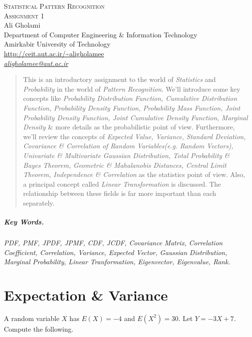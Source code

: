 \documentclass[12pt]{article}
\numberwithin{equation}{section}
\numberwithin{table}{section}
\numberwithin{figure}{section}
\begin{document}

\begin{center}
\textsc{\Large Statistical Pattern Recognition} \\[2pt]
	\textsc{\large Assignment 1}\\
	\vspace{0.5cm}
  Ali Gholami \\[6pt]
  Department of Computer Engineering \& Information Technology\\
  Amirkabir University of Technology  \\[6pt]
  \def\UrlFont{\em}
  \url{http://ceit.aut.ac.ir/~aligholamee}\\
    \href{mailto:aligholamee@aut.ac.ir}{\textit{aligholamee@aut.ac.ir}}
\end{center}

\begin{abstract}
This is an introductory assignment to the world of \textit{Statistics} and \textit{Probability} in the world of \textit{Pattern Recognition}. We'll introduce some key concepts like \textit{Probability Distribution Function, Cumulative Distribution Function, Probability Density Function, Probability Mass Function, Joint Probability Density Function, Joint Cumulative Density Function, Marginal Density} \& more details as the probabilistic point of view. Furthermore, we'll review the concepts of \textit{Expected Value, Variance, Standard Deviation, Covariance \& Correlation of Random Variables(e.g. Random Vectors), Univariate \& Multivariate Gaussian Distribution, Total Probability \& Bayes Theorem, Geometric \& Mahalanobis Distances, Central Limit Theorem, Independence \& Correlation} as the statistics point of view. Also, a principal concept called \textit{Linear Transformation} is discussed. The relationship between these fields is far more important than each separately.
\end{abstract}

\subparagraph{Key Words.} \textit{PDF, PMF, JPDF, JPMF, CDF, JCDF, Covariance Matrix, Correlation Coefficient, Correlation, Variance, Expected Vector, Gaussian Distribution, Marginal Probability, Linear Tranformation, Eigenvector, Eigenvalue, Rank.}

\section{Expectation \& Variance}

A random variable \textit{$X$} has \textit{$E(X) = -4$} and \textit{$E(X^2) = 30$.} Let \textit{$Y = -3X + 7$.} Compute the following.
\end{document}
